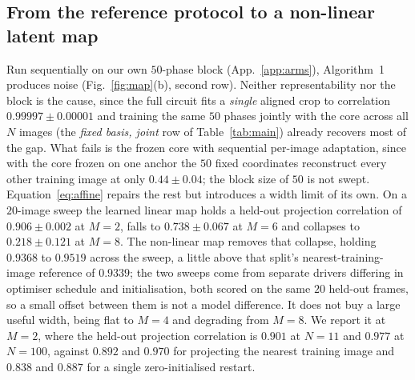 \documentclass{article}
\begin{document}
\subsection{From the reference protocol to a non-linear latent map}
\label{sec:latent}

Run sequentially on our own $50$-phase block (App.~\ref{app:arms}), Algorithm~1 produces noise
(Fig.~\ref{fig:map}(b), second row). Neither representability nor the block is the cause, since the
full circuit fits a \emph{single} aligned crop to correlation $0.99997 \pm 0.00001$ and training the
same $50$ phases jointly with the core across all $N$ images (the \emph{fixed basis, joint} row of
Table~\ref{tab:main}) already recovers most of the gap. What fails is the frozen core
with sequential per-image adaptation, since with the core frozen on one anchor the $50$ fixed
coordinates reconstruct every other training image at only $0.44 \pm 0.04$; the block size of $50$
is not swept. Equation~\eqref{eq:affine} repairs the rest but introduces a width limit of its
own. On a $20$-image sweep the learned linear map holds a held-out projection correlation of
$0.906 \pm 0.002$ at $M{=}2$, falls to $0.738 \pm 0.067$ at $M{=}6$ and collapses to
$0.218 \pm 0.121$ at $M{=}8$. The non-linear map removes that collapse, holding $0.9368$ to
$0.9519$ across the sweep, a little above that split's nearest-training-image reference of $0.9339$;
the two sweeps come from separate drivers differing in optimiser schedule
and initialisation, both
scored on the same $20$ held-out frames, so a small offset between them is not a model difference. It does not
buy a large useful width, being flat to $M{=}4$ and degrading from $M{=}8$. We report it at $M{=}2$, where the held-out projection correlation is $0.901$ at $N{=}11$
and $0.977$ at $N{=}100$, against $0.892$ and $0.970$ for projecting the nearest training image and
$0.838$ and $0.887$ for a single zero-initialised restart.
\end{document}
